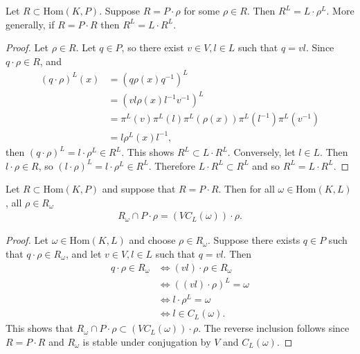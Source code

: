 \begin{lemma} \label{pr:lrl} Let $R \subset \mathrm{Hom}(K, P)$. Suppose $R = P \cdot \rho$ for some $\rho \in R$. Then $R^L = L\cdot \rho^L$.
	More generally, if $R = P \cdot R$ then $R^L = L \cdot R^L$.
\end{lemma}
\begin{proof}
	Let $\rho \in R$. Let $q \in P$, so there exist $v \in V, l \in L$ such that $q = vl$. Since $q\cdot\rho \in R$, and
	\begin{align*}
		(q \cdot \rho)^L(x) &= (q\rho(x)q^{-1})^L \\
			&= (vl\rho(x)l^{-1}v^{-1})^L \\
			&= \pi^L(v)\pi^L(l)\pi^L(\rho(x))\pi^L\left(l^{-1}\right)\pi^L\left(v^{-1}\right) \\
			&= l \rho^L(x) l^{-1},
	\end{align*}
	then $(q \cdot \rho)^L = l \cdot \rho^L \in R^L$. This shows $R^L \subset L \cdot R^L$. Conversely, let $l \in L$. Then $l \cdot \rho \in R$, so $(l \cdot \rho)^L = l\cdot \rho^L \in R^L$. Therefore $L\cdot R^L \subset R^L$ and so $R^L = L \cdot R^L$.
\end{proof}

\begin{lemma} \label{rsigma:vcl} Let $R \subset \mathrm{Hom}(K, P)$ and suppose that $R = P \cdot R$. Then for all $\omega \in \mathrm{Hom}(K, L)$, all $\rho\in R_\omega$
	\begin{align*}
		R_\omega \cap P \cdot \rho = \left(VC_L(\omega)\right) \cdot \rho.
	\end{align*}
\end{lemma}
\begin{proof}
	Let $\omega \in \mathrm{Hom}(K, L)$ and choose $\rho \in R_\omega$. Suppose there exists $q \in P$ such that $q \cdot \rho \in R_\omega$, and let $v \in V, l \in L$ such that $q = vl$. Then
	\begin{align*}
		q \cdot \rho \in R_\omega &\Leftrightarrow (vl) \cdot \rho \in R_\omega \\
		&\Leftrightarrow \left( (vl) \cdot \rho\right)^L = \omega \\
		&\Leftrightarrow l\cdot \rho^L = \omega \\
		&\Leftrightarrow l \in C_L(\omega).
	\end{align*}
	This shows that $R_\omega \cap P \cdot \rho \subset \left(VC_L(\omega)\right) \cdot \rho$. The reverse inclusion follows since $R = P \cdot R$ and $R_\omega$ is stable under conjugation by $V$ and $C_L(\omega)$.
\end{proof}

